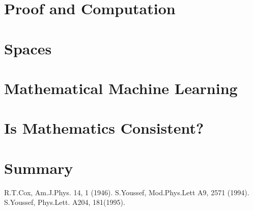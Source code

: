 \documentclass[11pt]{article}
\begin{document}
\section{Proof and Computation}
\section{Spaces}
\section{Mathematical Machine Learning}
\section{Is Mathematics Consistent?}
\section{Summary}


\begin{thebibliography}{10}
 R.T.Cox, Am.J.Phys. 14, 1 (1946).
 S.Youssef, Mod.Phys.Lett A9, 2571 (1994).
 S.Youssef, Phys.Lett. A204, 181(1995).

\end{thebibliography}
\end{document}
